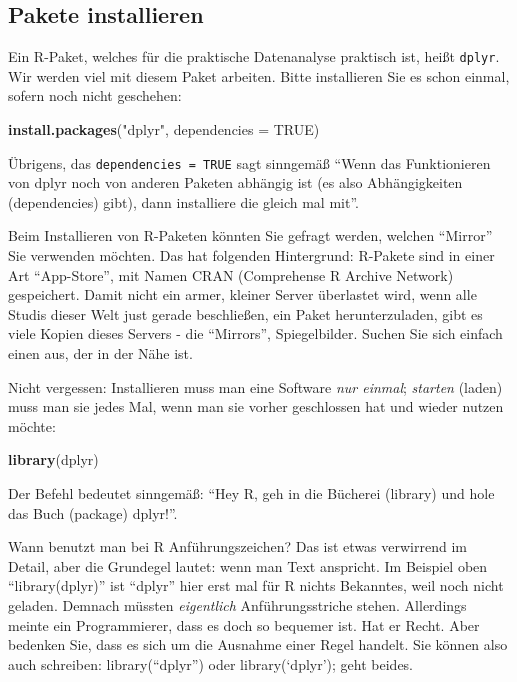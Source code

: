 \documentclass[12pt,]{book}
\newenvironment{Shaded}{\begin{snugshade}}{\end{snugshade}}
\newcommand{\KeywordTok}[1]{\textcolor[rgb]{0.13,0.29,0.53}{\textbf{{#1}}}}
\newcommand{\DataTypeTok}[1]{\textcolor[rgb]{0.13,0.29,0.53}{{#1}}}
\newcommand{\StringTok}[1]{\textcolor[rgb]{0.31,0.60,0.02}{{#1}}}
\newcommand{\OtherTok}[1]{\textcolor[rgb]{0.56,0.35,0.01}{{#1}}}
\newcommand{\NormalTok}[1]{{#1}}
\let\BeginKnitrBlock\begin \let\EndKnitrBlock\end
\begin{document}
\subsection{Pakete installieren}\label{pakete-installieren}

Ein R-Paket, welches für die praktische Datenanalyse praktisch ist,
heißt \texttt{dplyr}. Wir werden viel mit diesem Paket arbeiten. Bitte
installieren Sie es schon einmal, sofern noch nicht geschehen:

\begin{Shaded}
\begin{Highlighting}[]
\KeywordTok{install.packages}\NormalTok{(}\StringTok{"dplyr"}\NormalTok{, }\DataTypeTok{dependencies =} \OtherTok{TRUE}\NormalTok{) }
\end{Highlighting}
\end{Shaded}

Übrigens, das \texttt{dependencies\ =\ TRUE} sagt sinngemäß ``Wenn das
Funktionieren von dplyr noch von anderen Paketen abhängig ist (es also
Abhängigkeiten (dependencies) gibt), dann installiere die gleich mal
mit''.

\BeginKnitrBlock{rmdcaution}
Beim Installieren von R-Paketen könnten Sie gefragt werden, welchen
``Mirror'' Sie verwenden möchten. Das hat folgenden Hintergrund:
R-Pakete sind in einer Art ``App-Store'', mit Namen CRAN (Comprehense R
Archive Network) gespeichert. Damit nicht ein armer, kleiner Server
überlastet wird, wenn alle Studis dieser Welt just gerade beschließen,
ein Paket herunterzuladen, gibt es viele Kopien dieses Servers - die
``Mirrors'', Spiegelbilder. Suchen Sie sich einfach einen aus, der in
der Nähe ist.
\EndKnitrBlock{rmdcaution}

Nicht vergessen: Installieren muss man eine Software \emph{nur einmal};
\emph{starten} (laden) muss man sie jedes Mal, wenn man sie vorher
geschlossen hat und wieder nutzen möchte:

\begin{Shaded}
\begin{Highlighting}[]
\KeywordTok{library}\NormalTok{(dplyr) }
\end{Highlighting}
\end{Shaded}

Der Befehl bedeutet sinngemäß: ``Hey R, geh in die Bücherei (library)
und hole das Buch (package) dplyr!''.

\BeginKnitrBlock{rmdcaution}
Wann benutzt man bei R Anführungszeichen? Das ist etwas verwirrend im
Detail, aber die Grundegel lautet: wenn man Text anspricht. Im Beispiel
oben ``library(dplyr)'' ist ``dplyr'' hier erst mal für R nichts
Bekanntes, weil noch nicht geladen. Demnach müssten \emph{eigentlich}
Anführungsstriche stehen. Allerdings meinte ein Programmierer, dass es
doch so bequemer ist. Hat er Recht. Aber bedenken Sie, dass es sich um
die Ausnahme einer Regel handelt. Sie können also auch schreiben:
library(``dplyr'') oder library(`dplyr'); geht beides.
\EndKnitrBlock{rmdcaution}
\end{document}
